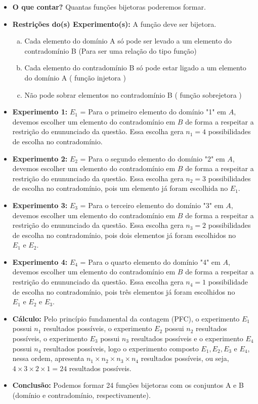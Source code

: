 \documentclass[a4paper,12pt]{article}
\begin{document}
\begin{enumerate}
   \begin{itemize}
     \item[\ding{172}] \textbf{O que contar?} Quantas funções bijetoras poderemos formar.
    \item[\ding{173}] \textbf{Restrições do(s) Experimento(s):} A função deve ser bijetora.
        \begin{enumerate}[a)]
          \item Cada elemento do domínio A só pode ser levado a um elemento do contradomínio B (Para ser uma relação do tipo função)
          \item Cada elemento do contradomínio B só pode estar ligado a um elemento do domínio A ( função injetora )
          \item Não pode sobrar elementos no contradomínio B ( função sobrejetora )          
        \end{enumerate}      
     \item[\ding{174}] \textbf{Experimento 1:} $E_1$ = Para o primeiro elemento do domínio "1" em $ A$, devemos escolher um elemento do contradomínio em $B$ de forma a respeitar a restrição do enununciado da questão. Essa escolha gera $n_1 = 4$ possibilidades de escolha no contradomínio.
     \item[\ding{175}] \textbf{Experimento 2:} $E_2$ = Para o segundo elemento do domínio "2" em $ A$, devemos escolher um elemento do contradomínio em $B$ de forma a respeitar a restrição do enununciado da questão. Essa escolha gera $n_2 = 3$ possibilidades de escolha no contradomínio, pois um elemento já foram escolhida no $E_1$.
     \item[\ding{176}] \textbf{Experimento 3:} $E_3$ = Para o terceiro elemento do domínio "3" em $ A$, devemos escolher um elemento do contradomínio em $B$ de forma a respeitar a restrição do enununciado da questão. Essa escolha gera $n_3 = 2$ possibilidades de escolha no contradomínio, pois dois elementos já foram escolhidos no $E_1 \textrm{ e } E_2$.
     \item[\ding{177}] \textbf{Experimento 4:} $E_4$ = Para o quarto elemento do domínio "4" em $ A$, devemos escolher um elemento do contradomínio em $B$ de forma a respeitar a restrição do enununciado da questão. Essa escolha gera $n_4 = 1$ possibilidade de escolha no contradomínio, pois três elementos já foram escolhidos no $E_1 \textrm{ e } E_2 \textrm{ e } E_3$.
         \item[\ding{176}] \textbf{Cálculo:} Pelo princípio fundamental da contagem (PFC), o experimento $E_1$ possui $n_1$ resultados possíveis, o experimento $E_2$ possui $n_2$ resultados possíveis, o experimento $E_3$ possui $n_3$ resultados possíveis e o experimento $E_4$ possui $n_4$ resultados possíveis, logo o experimento composto $E_1, E_2, E_3 \textrm{ e } E_4$, nessa ordem, apresenta $n_1 \times n_2 \times n_3 \times n_4$ resultados possíveis, ou seja, $4 \times 3 \times 2 \times 1 = 24$ resultados possíveis.
    \item[\ding{177}] \textbf{Conclusão:} Podemos formar 24 funções bijetoras com os conjuntos A e B (domínio e contradomínio, respectivamente).


\end{itemize}
\end{enumerate}
\end{document}
